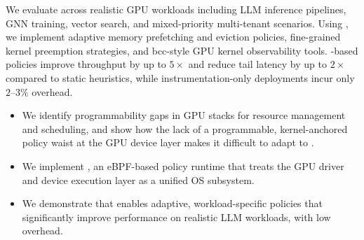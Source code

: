 We evaluate \sys across realistic GPU workloads including LLM inference pipelines, GNN training, vector search, and mixed-priority multi-tenant scenarios. Using \sys, we implement adaptive memory prefetching and eviction policies, fine-grained kernel preemption strategies, and bcc-style GPU kernel observability tools. \sys-based policies improve throughput by up to $5\times$ and reduce tail latency by up to $2\times$ compared to static heuristics, while instrumentation-only deployments incur only $2$–$3\%$ overhead. 

\begin{itemize}[leftmargin=*,itemsep=0pt]
    \item We identify 
    programmability gaps in GPU stacks for resource management and scheduling, and show how the lack of a programmable, kernel-anchored policy waist at the GPU device layer makes it difficult to adapt to .
    \item We implement \sys, an eBPF-based policy runtime that treats the GPU driver and device execution layer as a unified OS subsystem. 
    \item We demonstrate that \sys enables adaptive, workload-specific policies that significantly improve performance
    on realistic LLM 
    workloads, with low overhead.
\end{itemize}
